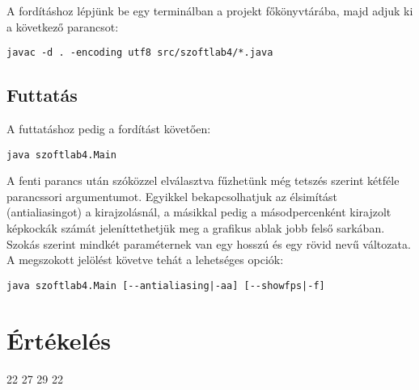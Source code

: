 A fordításhoz lépjünk be egy terminálban a projekt főkönyvtárába, majd adjuk ki a következő parancsot:
\lstset{escapeinside=`', xleftmargin=10pt, frame=single, basicstyle=\ttfamily\footnotesize, language=sh}
\begin{lstlisting}
javac -d . -encoding utf8 src/szoftlab4/*.java
\end{lstlisting}

\subsection{Futtatás}
A futtatáshoz pedig a fordítást követően:
\lstset{escapeinside=`', xleftmargin=10pt, frame=single, basicstyle=\ttfamily\footnotesize, language=sh}
\begin{lstlisting}
java szoftlab4.Main
\end{lstlisting}

A fenti parancs után szóközzel elválasztva fűzhetünk még tetszés szerint kétféle parancssori argumentumot.
Egyikkel bekapcsolhatjuk az élsimítást (antialiasingot) a kirajzolásnál, a másikkal pedig a másodpercenként kirajzolt képkockák számát jeleníttethetjük meg a grafikus ablak jobb felső sarkában. Szokás szerint mindkét paraméternek van egy hosszú és egy rövid nevű változata.\\

A megszokott jelölést követve tehát a lehetséges opciók:

\begin{lstlisting}
java szoftlab4.Main [--antialiasing|-aa] [--showfps|-f]
\end{lstlisting}

\newpage

\section{Értékelés}

\begin{ertekeles}
{22}        %
{27}
{29}
{22}
\end{ertekeles}

